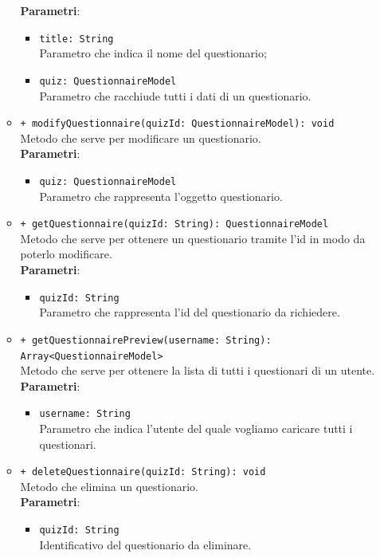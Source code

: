 \begin{itemize}
\begin{itemize}
			\textbf{Parametri}:
			\begin{itemize}
				\item \texttt{title: String} \\ Parametro che indica il nome del questionario;
				\item \texttt{quiz: QuestionnaireModel} \\ Parametro che racchiude tutti i dati di un questionario.
			\end{itemize}
			\item \texttt{+ modifyQuestionnaire(quizId: QuestionnaireModel): void} \\ Metodo che serve per modificare un questionario. \\
			\textbf{Parametri}:
			\begin{itemize}
				\item \texttt{quiz: QuestionnaireModel}\\
				Parametro che rappresenta l'oggetto questionario.
			\end{itemize}
			\item \texttt{+ getQuestionnaire(quizId: String): QuestionnaireModel} \\Metodo che serve per ottenere un questionario tramite l'id in modo da poterlo modificare. \\
			\textbf{Parametri}:
			\begin{itemize}
				\item \texttt{quizId: String}\\
				Parametro che rappresenta l'id del questionario da richiedere.
			\end{itemize}
			\item \texttt{+ getQuestionnairePreview(username: String): Array<QuestionnaireModel>} \\ Metodo che serve per ottenere la lista di tutti i questionari di un utente. \\
			\textbf{Parametri}:
			\begin{itemize}
				\item \texttt{username: String}\\
				Parametro che indica l'utente del quale vogliamo caricare tutti i questionari.
			\end{itemize}
			\item \texttt{+ deleteQuestionnaire(quizId: String): void} \\ 
			Metodo che elimina un questionario. \\
			\textbf{Parametri}:
			\begin{itemize}
				\item \texttt{quizId: String}\\
				Identificativo del questionario da eliminare.
			\end{itemize}
			

\end{itemize}
\end{itemize}

